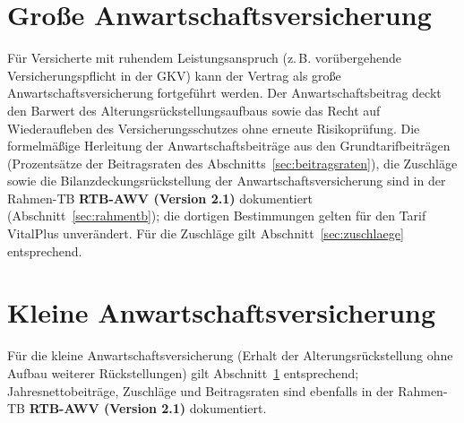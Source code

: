 \section{Große Anwartschaftsversicherung}\label{sec:awv}

Für Versicherte mit ruhendem Leistungsanspruch (z.\,B. vorübergehende
Versicherungspflicht in der GKV) kann der Vertrag als große
Anwartschaftsversicherung fortgeführt werden. Der Anwartschaftsbeitrag
deckt den Barwert des Alterungsrückstellungsaufbaus sowie das Recht auf
Wiederaufleben des Versicherungsschutzes ohne erneute Risikoprüfung.
Die formelmäßige Herleitung der Anwartschaftsbeiträge aus den
Grundtarifbeiträgen (Prozentsätze der Beitragsraten des
Abschnitts~\ref{sec:beitragsraten}), die Zuschläge sowie die
Bilanzdeckungsrückstellung der Anwartschaftsversicherung sind in der
Rahmen-TB \textbf{RTB-AWV (Version 2.1)} dokumentiert
(Abschnitt~\ref{sec:rahmentb}); die dortigen Bestimmungen gelten für
den Tarif VitalPlus unverändert. Für die Zuschläge gilt
Abschnitt~\ref{sec:zuschlaege} entsprechend.

\section{Kleine Anwartschaftsversicherung}\label{sec:kleineawv}

Für die kleine Anwartschaftsversicherung (Erhalt der
Alterungsrückstellung ohne Aufbau weiterer Rückstellungen) gilt
Abschnitt~\ref{sec:awv} entsprechend; Jahresnettobeiträge, Zuschläge
und Beitragsraten sind ebenfalls in der Rahmen-TB \textbf{RTB-AWV
(Version 2.1)} dokumentiert.
\clearpage
